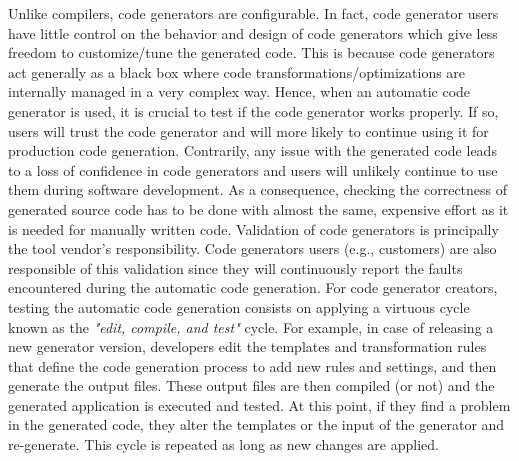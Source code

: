 
Unlike compilers, code generators are  configurable. In fact, code generator users have little control on the behavior and design of code generators which give less freedom to customize/tune the generated code. This is because code generators act generally as a black box where code transformations/optimizations are internally managed in a very complex way. Hence, when an automatic code generator is used, it is crucial to test if the code generator works properly. If so, users will trust the code generator and will more likely to continue using it for production code generation. Contrarily, any issue with the generated code leads to a loss of confidence in code generators and users will unlikely continue to use them during software development. As a consequence, checking the correctness of generated source code has to be done with almost the same, expensive effort as it is needed for manually written code.
Validation of code generators is principally the tool vendor's responsibility. Code generators users (e.g., customers) are also responsible of this validation since they will continuously report the faults encountered during the automatic code generation. 
For code generator creators, testing the automatic code generation consists on applying a virtuous cycle known as the \textit{"edit, compile, and test"} cycle. 
For example, in case of releasing a new generator version, developers edit the templates and transformation rules that define the code generation process to add new rules and settings, and then generate the output files. These output files are then compiled (or not) and the generated application is executed and tested. At this point, if they find a problem in the generated code, they alter the templates or the input of the generator and re-generate. This cycle is repeated as long as new changes are applied. 
